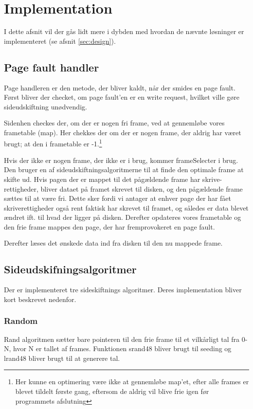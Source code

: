 \section{Implementation}
I dette afsnit vil der gås lidt mere i dybden med hvordan de nævnte løsninger er implementeret (se afsnit \ref{sec:design}).

\subsection{Page fault handler}
Page handleren er den metode, der bliver kaldt, når der smides en page fault. Først bliver der checket, om page fault'en er en write request, hvilket ville gøre sideudskiftning unødvendig.

Sidenhen checkes der, om der er nogen fri frame, ved at gennemløbe vores frametable (map). Her chekkes der om der er nogen frame, der aldrig har været brugt; at den i frametable er -1.\footnote{Her kunne en optimering være ikke at gennemløbe map'et, efter alle frames er blevet tildelt første gang, eftersom de aldrig vil blive frie igen før programmets afslutning}

Hvis der ikke er nogen frame, der ikke er i brug, kommer frameSelecter i brug. Den bruger en af sideudskiftningsalgoritmerne til at finde den optimale frame at skifte ud. Hvis pagen der er mappet til det pågældende frame har skrive-rettigheder, bliver dataet på framet skrevet til disken, og den pågældende frame sættes til at være fri. Dette sker fordi vi antager at enhver page der har fået skriverettigheder også rent faktisk har skrevet til framet, og således er data blevet ændret ift. til hvad der ligger på disken. Derefter opdateres vores frametable og den frie frame mappes den page, der har fremprovokeret en page fault.

Derefter læses det ønskede data ind fra disken til den nu mappede frame.

\subsection{Sideudskifningsalgoritmer}
Der er implementeret tre sideskiftnings algoritmer. Deres implementation bliver kort beskrevet nedenfor.

\subsubsection{Random}
Rand algoritmen sætter bare pointeren til den frie frame til et vilkårligt tal fra 0-N, hvor N er tallet af frames. Funktionen srand48 bliver brugt til seeding og lrand48 bliver brugt til at generere tal.

